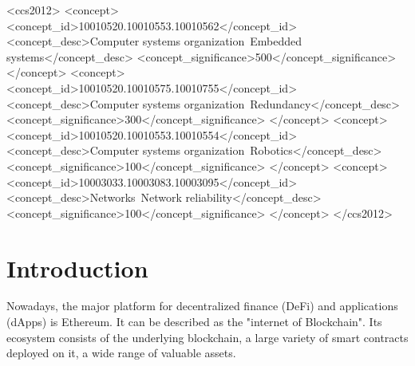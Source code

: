 \documentclass[a4paper,sigconf, language=french,
language=german, language=spanish, language=english]{acmart}
\begin{document}
\begin{CCSXML}
<ccs2012>
 <concept>
  <concept_id>10010520.10010553.10010562</concept_id>
  <concept_desc>Computer systems organization~Embedded systems</concept_desc>
  <concept_significance>500</concept_significance>
 </concept>
 <concept>
  <concept_id>10010520.10010575.10010755</concept_id>
  <concept_desc>Computer systems organization~Redundancy</concept_desc>
  <concept_significance>300</concept_significance>
 </concept>
 <concept>
  <concept_id>10010520.10010553.10010554</concept_id>
  <concept_desc>Computer systems organization~Robotics</concept_desc>
  <concept_significance>100</concept_significance>
 </concept>
 <concept>
  <concept_id>10003033.10003083.10003095</concept_id>
  <concept_desc>Networks~Network reliability</concept_desc>
  <concept_significance>100</concept_significance>
 </concept>
</ccs2012>
\end{CCSXML}






\maketitle

\section{Introduction}
Nowadays, the major platform for decentralized ﬁnance (DeFi) 
and applications (dApps) is Ethereum. It can be described as the "internet of Blockchain".
Its ecosystem consists of the underlying blockchain, a large
variety of smart contracts deployed on it, a wide range of
valuable assets. 
\end{document}
